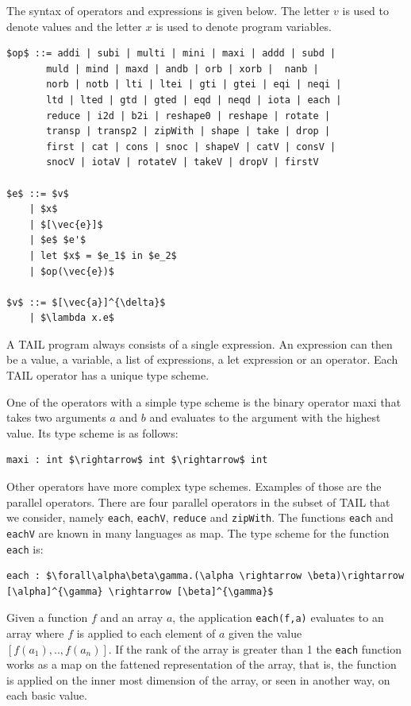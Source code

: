 \documentclass[11pt]{article}
\begin{document}
The syntax of operators and expressions is given below. The letter $v$ is used to denote values and the letter $x$ is used to denote program variables. 
\begin{lstlisting}[numbers=none,frame=none]
$op$ ::= addi | subi | multi | mini | maxi | addd | subd | 
       muld | mind | maxd | andb | orb | xorb |  nanb | 
       norb | notb | lti | ltei | gti | gtei | eqi | neqi |
       ltd | lted | gtd | gted | eqd | neqd | iota | each |
       reduce | i2d | b2i | reshape0 | reshape | rotate |
       transp | transp2 | zipWith | shape | take | drop |
       first | cat | cons | snoc | shapeV | catV | consV | 
       snocV | iotaV | rotateV | takeV | dropV | firstV 

$e$ ::= $v$ 
    | $x$ 
    | $[\vec{e}]$ 
    | $e$ $e'$ 
    | let $x$ = $e_1$ in $e_2$ 
    | $op(\vec{e})$

$v$ ::= $[\vec{a}]^{\delta}$
    | $\lambda x.e$
\end{lstlisting}
A TAIL program always consists of a single expression. An expression can then be a value, a variable, 
a list of expressions, a let expression or an operator. Each TAIL operator has a unique type scheme.

One of the operators with a simple type scheme is the binary operator maxi that takes two arguments $a$ and $b$ and evaluates to the argument with the highest value. Its type scheme is as follows:
\begin{lstlisting}[numbers=none,frame=none]
maxi : int $\rightarrow$ int $\rightarrow$ int
\end{lstlisting}

Other operators have more complex type schemes. Examples of those are the parallel operators. 
There are four parallel operators in the subset of TAIL that we consider, namely {\tt each}, {\tt eachV}, {\tt reduce} and {\tt zipWith}.
The functions {\tt each} and {\tt eachV} are known in many languages as map.
The type scheme for the function {\tt each} is:
\begin{lstlisting}[numbers=none,frame=none]
each : $\forall\alpha\beta\gamma.(\alpha \rightarrow \beta)\rightarrow [\alpha]^{\gamma} \rightarrow [\beta]^{\gamma}$
\end{lstlisting}
Given a function $f$ and an array $a$, the application {\tt each(f,a)} evaluates to an array where $f$ is applied to each element of $a$ given the value $[f(a_1),..,f(a_n)]$.
If the rank of the array is greater than 1 the {\tt each} function works as a map on the fattened representation of the array,
that is, the function is applied on the inner most dimension of the array, or seen in another way, on each basic value.
\end{document}
